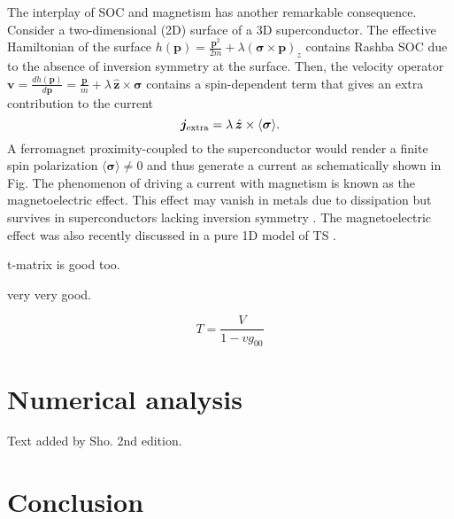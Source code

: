 \documentclass[twocolumn,showpacs,floatfix,nofootinbib,longbibliography]{revtex4-1}
\begin{document}
The interplay of SOC and magnetism has another remarkable consequence. Consider a two-dimensional (2D) surface of a 3D superconductor. The effective Hamiltonian of the surface $h(\bm p) = \frac{{\bm p}^2}{2m} + \lambda\left( \bm\sigma\times\bm p\right)_z$ contains Rashba SOC due to the absence of inversion symmetry at the surface. Then, the velocity operator $\bm v= {\frac{dh(\bm p)}{d\bm p} =\frac{\bm p}{m}+ \lambda \,\hat{\bm z}\times\bm\sigma}$ contains a spin-dependent term that gives an extra contribution to the current
\begin{equation}
	\bm j_{\rm extra} = \lambda\,  \hat{\bm z}\times\langle\bm\sigma\rangle . \label{main}
\end{equation}
A ferromagnet proximity-coupled to the superconductor would render a finite spin polarization $\langle \bm \sigma \rangle \neq 0$ and thus generate a current as schematically shown in Fig. The phenomenon of driving a current with magnetism is known as the magnetoelectric effect. This effect may vanish in metals due to dissipation but survives in superconductors lacking inversion symmetry \cite{Levitov1985, Edelstein1989, Edelstein1995, Yip2001, BauerSigrist2012}. The magnetoelectric effect was also recently discussed in a pure 1D model of TS \cite{Ojanen2012}. 

t-matrix is good too.

very very good.

\begin{equation}
 T = \frac{V}{1-vg_{00}}
\end{equation}

\section{Numerical analysis} \label{sec:numerics}
Text added by Sho.
2nd edition. 

\section{Conclusion} \label{sec:conclusion}




\newpage
%

\end{document}
